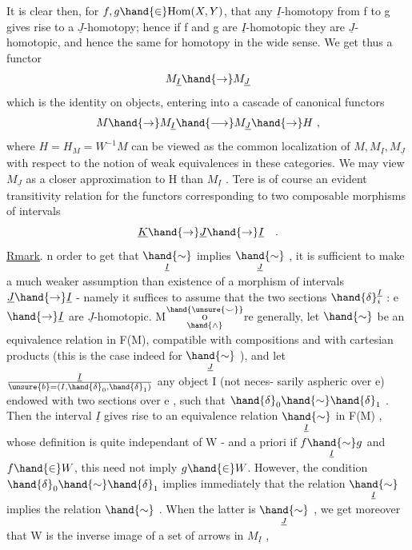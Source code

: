 It is clear then,  for $f,g\hand{\in}\mathrm{Hom}(X,Y)$,  that any $\underline{I}$-homotopy from f to g
gives rise to a $\underline{J}$-homotopy; hence if f and g are $\underline{I}$-homotopic they are
$\underline{J}$-homotopic,  and hence the same for homotopy in the wide sense.  We get
thus a  functor
\[ M_{\underline{I}} \hand{\to} M_{\underline{J}} \]
which is the identity on objects,  entering into a cascade of canonical
functors
\[ M \hand{\to} M_{\underline{I}} \hand{\longrightarrow} M_{\underline{J}} \hand{\to} H \ , \]
where  $H=H_M= W^{-1} M$  can be viewed as the common localization of $M,M_{\underline{I}},M_{\underline{J}}$
with respect to the notion of weak equivalences in these categories.  We
may view $M_{\underline{J}}$  as a closer approximation to H than $M_{\underline{I}}$ .  Tere  is of course
an evident transitivity relation for the functors corresponding to two
composable morphisms of intervals
\[ \underline{K} \hand{\to} \underline{J} \hand{\to} \underline{I} \quad . \]
\uline{Rmark}.  n order to get that $\underset{\underline{I}}{\hand{\sim}}$ implies $\underset{\underline{J}}{\hand{\sim}}$ ,  it is sufficient to
make a much weaker assumption than existence of a morphism of intervals
$\underline{J}\hand{\to}\underline{I}$  -  namely it suffices to assume that the two sections $\hand{\delta}^{\underline{I}}_{i}$ : e $\hand{\to} \underline{I}$
are $\underline{J}$-homotopic.  M$\overset{\hand{\unsure{\smile}}}{\underset{\hand{\wedge}}{\mathrm o}}$re generally,  let $\hand{\sim}$ be an equivalence relation in
F(M),  compatible with compositions and with cartesian products (this is
the case indeed for $\underset{\underline{J}}{\hand{\sim}}$ ),  and let  $\underline{I} \over{\unsure{b}}{=} (I,\hand{\delta}_0,\hand{\delta}_1)$ any object I  (not neces-%
sarily aspheric over e) endowed with two sections over e ,  such that
$\hand{\delta}_0\hand{\sim}\hand{\delta}_1$ .   Then the interval $\underline{I}$ gives rise to an equivalence relation $\underset{\underline{I}}{\hand{\sim}}$
in F(M) , whose definition is quite independant of W -  and a priori
 if  $f\underset{\underline{I}}{\hand{\sim}}g$  and $f\hand{\in}W$,  this need not
imply $g\hand{\in}W$.  However,  the condition $\hand{\delta}_0\hand{\sim}\hand{\delta}_1$  implies immediately that the
 relation  $\underset{\underline{I}}{\hand{\sim}}$  implies the relation $\hand{\sim}$ .  When the latter is
$\underset{\underline{J}}{\hand{\sim}}$ ,  we get moreover that W is the inverse image of a set of arrows in
$M_{\underline{I}}$ , 

